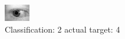 \begin{figure}[h!]
\begin{center}
\includegraphics[width=0.60\columnwidth]{figures/ID850_class_2_target_4.png}
\end{center}
\caption{ Classification: 2 actual target: 4}
\label{fig:ID850_class_2_target_4}
\end{figure}
